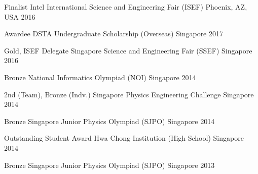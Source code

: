 

\begin{cvhonors}

\cvhonor
{Finalist} %
{Intel International Science and Engineering Fair (ISEF)} %
{Phoenix, AZ, USA} %
{2016} %


\end{cvhonors}




\begin{cvhonors}


\cvhonor
{Awardee} %
{DSTA Undergraduate Scholarship (Overseas)} %
{Singapore} %
{2017} %


\cvhonor
{Gold, ISEF Delegate} %
{Singapore Science and Engineering Fair (SSEF)} %
{Singapore} %
{2016} %


\cvhonor
{Bronze} %
{National Informatics Olympiad (NOI)} %
{Singapore} %
{2014} %


\cvhonor
{2nd (Team), Bronze (Indv.)} %
{Singapore Physics Engineering Challenge} %
{Singapore} %
{2014} %


\cvhonor
{Bronze} %
{Singapore Junior Physics Olympiad (SJPO)} %
{Singapore} %
{2014} %


\cvhonor
{Outstanding Student Award} %
{Hwa Chong Institution (High School)} %
{Singapore} %
{2014} %



\cvhonor
{Bronze} %
{Singapore Junior Physics Olympiad (SJPO)} %
{Singapore} %
{2013} %


\end{cvhonors}